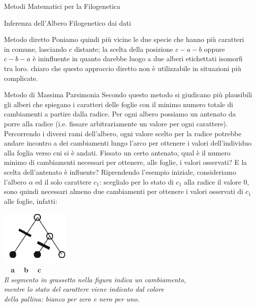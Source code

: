 \documentclass{article}
\begin{document}
\begin{section}{Metodi Matematici per la Filogenetica}
\begin{subsection}{Inferenza dell’Albero Filogenetico dai dati}
\begin{subsubsection}{Metodo diretto}
				Poniamo quindi più vicine le due specie che hanno più caratteri in comune, lasciando $c$ distante; la scelta della posizione $c-a-b$ oppure $c-b-a$ è ininfluente in quanto darebbe luogo a due alberi etichettati isomorfi tra loro. \Egrave chiaro che questo approccio diretto non è utilizzabile in situazioni più complicate.
			\end{subsubsection}
		
			\begin{subsubsection}{Metodo di Massima Parsimonia}
				Secondo questo metodo si giudicano più plausibili gli alberi che spiegano i caratteri delle foglie con il minimo numero totale di cambiamenti a partire dalla radice.
				Per ogni albero possiamo  un antenato da porre alla radice (i.e. fissare arbitrariamente un valore per ogni carattere). 
				Percorrendo i diversi rami dell’albero, ogni valore scelto per la radice potrebbe andare incontro a dei cambiamenti lungo l’arco per ottenere i valori dell’individuo alla foglia verso cui si è andati. Fissato un certo antenato, qual è il numero minimo di cambiamenti necessari per ottenere, alle foglie, i valori osservati? E la scelta dell'antenato è influente?
				Riprendendo l'esempio iniziale, consideriamo l’albero $\alpha$ ed il solo carattere $c_1$: sceglialo per lo stato di $c_1$ alla radice il valore $0$, sono quindi necessari almeno due cambiamenti per ottenere i valori osservati di $c_1$ alle foglie, infatti:
				\begin{center}
					\vspace{3pt}
					\includegraphics[width=0.25\textwidth]{Pics/parsimonia.png}
					\\ \ \, \textbf{a} \qquad \ \, \textbf{b} \ \qquad\, \textbf{c}
					\\ \vspace{6pt}
					\emph{Il segmento in grassetto nella figura indica un cambiamento, \\ mentre lo stato del carattere viene indicato dal colore \\ della pallina: bianco per zero e nero per uno.}
					\vspace{6pt}
				\end{center}
				

\end{subsubsection}
\end{subsection}
\end{section}
\end{document}
